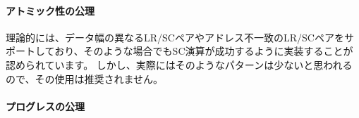 \paragraph{アトミック性の公理}
\label{rvwmo:ax:atom}
\atomicityaxiom

\begin{commentary}
  \begin{comment}
  The \nameref{rvwmo:ax:atom} theoretically supports LR/SC pairs of different widths and to mismatched addresses, since implementations are permitted to allow SC operations to succeed in such cases.  However, in practice, we expect such patterns to be rare, and their use is discouraged.
  \end{comment}
  理論的には、データ幅の異なるLR/SCペアやアドレス不一致のLR/SCペアをサポートしており、そのような場合でもSC演算が成功するように実装することが認められています。 しかし、実際にはそのようなパターンは少ないと思われるので、その使用は推奨されません。
\end{commentary}

\paragraph{プログレスの公理}
\label{rvwmo:ax:prog}
\progressaxiom


